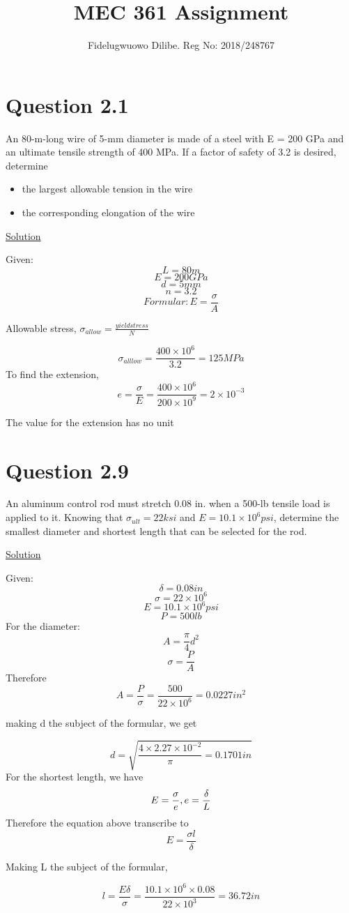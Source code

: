 \documentclass{article}
\title{MEC 361 Assignment}
\author{Fidelugwuowo Dilibe. Reg No: 2018/248767}
\begin{document}
\maketitle
\newpage
\section*{Question 2.1}
An 80-m-long wire of 5-mm diameter is made of a steel with E = 200 GPa and an ultimate tensile strength of 400 MPa. If a factor of safety of 3.2 is desired, determine 
\begin{itemize}
\item the largest allowable tension in the wire
\item the corresponding elongation of the wire
\end{itemize}
\begin{center} \underline{Solution}\end{center}
Given:\[L = 80m\]
\[E = 200GPa\]
\[d = 5mm\]
\[n=3.2\]
\[Formular: E = \frac{\sigma}{A}\]
\begin{center}Allowable stress, $ \sigma_{allow} = \frac{yield stress}{N}$\end{center}
\[\sigma_{alllow} = \frac{400 \times 10^{6}}{3.2} = 125MPa\]
 To find the extension,
\[e = \frac{\sigma}{E} = \frac{400 \times10^{6}}{200 \times 10^{9}} = 2 \times 10^{-3}\]
\begin{center} The value for the extension has no unit \end{center}
\section*{Question 2.9}
An aluminum control rod must stretch 0.08 in. when a 500-lb  tensile load is applied to it. Knowing that $\sigma_{ult} = 22ksi$ and $E = 10.1 \times 10^{6}psi$, determine the smallest diameter and shortest length that can be selected for the rod.
\begin{center} \underline{Solution}\end{center}
Given:
	\[\delta = 0.08in\]
	\[\sigma = 22 \times 10^{6}\]
	\[E = 10.1 \times 10^{6}psi\]
	\[P = 500lb\]
For the diameter:
\[A = \frac{\pi}{4}d^{2}\]
\[\sigma = \frac{P}{A}\]
Therefore \[A= \frac{P}{\sigma} = \frac{500}{22\times10^{6}} = 0.0227in^{2}\]
\begin{center} making d the subject of the formular, we get \end{center}
\[d = \sqrt{\frac{4\times2.27\times10^{-2}}{\pi} = 0.1701in}\]
For the shortest length, we have
\[E = \frac{\sigma}{e}, \space e = \frac{\delta}{L}\]
Therefore the equation above transcribe to
\[E = \frac{\sigma l}{\delta}\]
\begin{center} Making L the subject of the formular, \end{center}
\[l = \frac{E\delta}{\sigma}=\frac{10.1\times10^{6}\times0.08}{22\times10^{3}} = 36.72in\]
\end{document}
